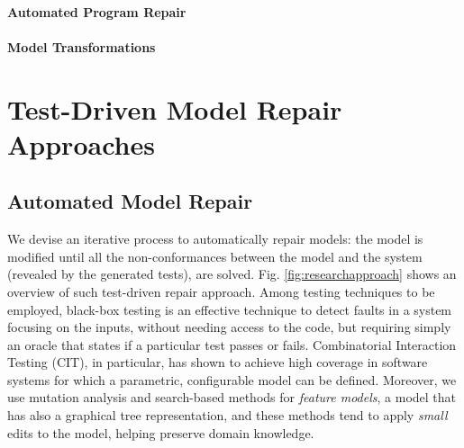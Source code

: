\documentclass [a4paper, 12pt, twoside]{report}
\theoremstyle{plain}
\theoremstyle{definition}
\theoremstyle{remark}
\theoremstyle{plain}
\theoremstyle{plain}
\theoremstyle{remark}
\begin{document}
\subsection{Automated Program Repair}
\subsection{Model Transformations}

\part{Test-Driven Model Repair Approaches}
\chapter{Automated Model Repair}

We devise an iterative process to automatically repair models: the model is modified until all the non-conformances between the model and the system (revealed by the generated tests), are solved. Fig. \ref{fig:researchapproach} shows an overview of such test-driven repair approach. 
Among testing techniques to be employed, black-box testing is an effective technique to detect faults in a system focusing on the inputs, without needing access to the code, but requiring simply an oracle that states if a particular test %
passes or fails. 
Combinatorial Interaction Testing (CIT), in particular, has shown to achieve high coverage in software systems for which a parametric, configurable model can be defined. Moreover, we use mutation analysis and search-based methods for \textit{feature models}, a model that has also a graphical tree representation, and these methods tend to apply \textit{small} edits to the model, helping preserve domain knowledge.
\end{document}
